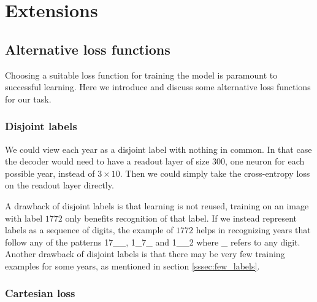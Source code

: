 \section{Extensions}

\subsection{Alternative loss functions}

Choosing a suitable loss function for training the model is paramount to successful learning. Here we introduce and discuss some alternative loss functions for our task.


\subsubsection{Disjoint labels}


We could view each year as a disjoint label with nothing in common. In that case the decoder would need to have a readout layer of size $300$, one neuron for each possible year, instead of $3 \times 10$. Then we could simply take the cross-entropy loss on the readout layer directly.

A drawback of disjoint labels is that learning is not reused, training on an image with label $1772$ only benefits recognition of that label.
If we instead represent labels as a sequence of digits, the example of $1772$ helps in recognizing years that follow any of the patterns 17\_\_, 1\_7\_ and 1\_\_2 where \_ refers to any digit.
Another drawback of disjoint labels is that there may be very few training examples for some years, as mentioned in section \ref{sssec:few_labels}.



\subsubsection{Cartesian loss}

